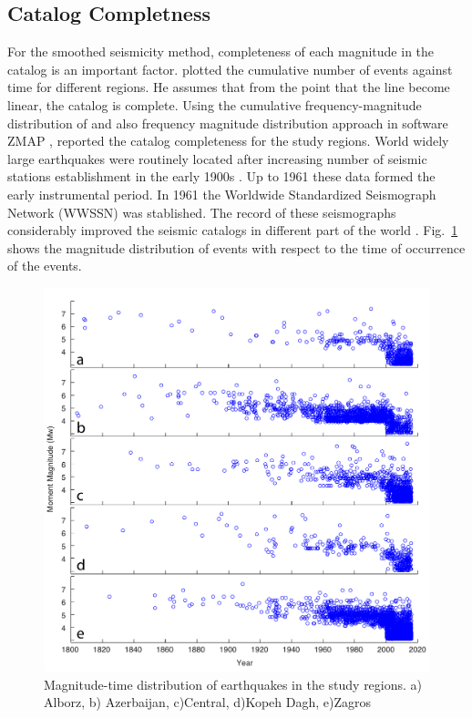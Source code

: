 \subsection{Catalog Completness}
For the smoothed seismicity method, completeness of each magnitude in the catalog is an important factor.  \citet{Frankel1995} plotted the cumulative number of events against time for different regions. He assumes that from the point that the line become linear, the catalog is complete. Using the cumulative frequency-magnitude distribution of \citet{Gutenberg1944} and also frequency magnitude distribution approach in software ZMAP \citep{Wiemer2001}, \citet{Zare2014} reported the catalog completeness for the study regions. World widely large earthquakes were routinely located after increasing number of seismic stations establishment in the early 1900s \citep{Shearer2009}. Up to 1961 these data formed the early instrumental period. In 1961 the Worldwide Standardized Seismograph Network (WWSSN) was stablished. The record of these seismographs considerably improved the seismic catalogs in different part of the world \citep{Shearer2009}. Fig.~\ref{fig:completness_scatter} shows the magnitude distribution of events with respect to the time of occurrence of the events.

\begin{figure} [!ht]
\centering
\includegraphics[scale=0.6]{figures/pdf/completness_scatter.pdf} 
\caption{Magnitude-time distribution of earthquakes in the study regions. a) Alborz, b) Azerbaijan, c)Central, d)Kopeh Dagh, e)Zagros}
\label{fig:completness_scatter}
\end{figure}

